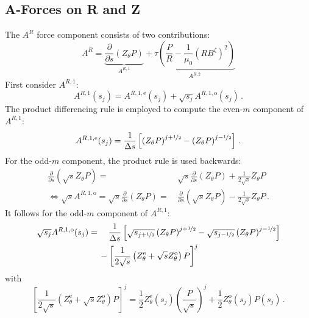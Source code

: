 \subsection{A-Forces on R and Z}
The $A^R$ force component consists of two contributions:
\begin{equation}
  A^R =   \underbrace{\frac{\partial}{\partial s} \left( Z_\theta P \right)}_{A^{R,1}}
        + \underbrace{\tau \left( \frac{P}{R} - \frac{1}{\mu_0} \left( R B^\zeta \right)^2 \right)}_{A^{R,2}}
\end{equation}
First consider $A^{R,1}$:
\begin{equation}
  A^{R,1}(s_j) = A^{R,1,\mathrm{e}}(s_j) + \sqrt{s_j} A^{R,1,\mathrm{o}} (s_j) \, .
\end{equation}
The product differencing rule is employed to compute the even-$m$ component of $A^{R,1}$:
\begin{equation}
  A^{R,1,\mathrm{e}} (s_j) = \frac{1}{\Delta s} \left[ \left( Z_\theta P \right)^{j+\nicefrac{1}{2}} - \left( Z_\theta P \right)^{j-\nicefrac{1}{2}} \right] \, .
\end{equation}
For the odd-$m$ component, the product rule is used backwards:
\begin{align}
  \frac{\partial}{\partial s} \left( \sqrt{s} Z_\theta P \right) =&\, \sqrt{s} \frac{\partial}{\partial s} \left( Z_\theta P \right) + \frac{1}{2 \sqrt{s}} Z_\theta P \nonumber \\
  \Leftrightarrow
  \sqrt{s} A^{R,1,\mathrm{o}} =
  \sqrt{s} \frac{\partial}{\partial s} \left( Z_\theta P \right) =&\, \frac{\partial}{\partial s} \left( \sqrt{s} Z_\theta P \right) - \frac{1}{2 \sqrt{s}} Z_\theta P \, .
\end{align}
It follows for the odd-$m$ component of $A^{R,1}$:
\begin{align}
  \sqrt{s_j} A^{R,1,\mathrm{o}} (s_j)
  =&\, \phantom{-}~ \frac{1}{\Delta s} \left[ \sqrt{s_{j+\nicefrac{1}{2}}} \left( Z_\theta P \right)^{j+\nicefrac{1}{2}} - \sqrt{s_{j-\nicefrac{1}{2}}} \left( Z_\theta P \right)^{j-\nicefrac{1}{2}} \right] \nonumber \\
  ~&\,          -   \left[ \frac{1}{2 \sqrt{s}} \left( Z_\theta^\mathrm{e} + \sqrt{s} Z_\theta^\mathrm{o} \right) P \right]^j
\end{align}
with
\begin{equation}
  \left[ \frac{1}{2 \sqrt{s}} \left( Z_\theta^\mathrm{e} + \sqrt{s} Z_\theta^\mathrm{o} \right) P \right]^j
  = \frac{1}{2} Z_\theta^\mathrm{e}(s_j) \left(\frac{P}{\sqrt{s}}\right)^j + \frac{1}{2} Z_\theta^\mathrm{o}(s_j) P(s_j) \, .
\end{equation}
